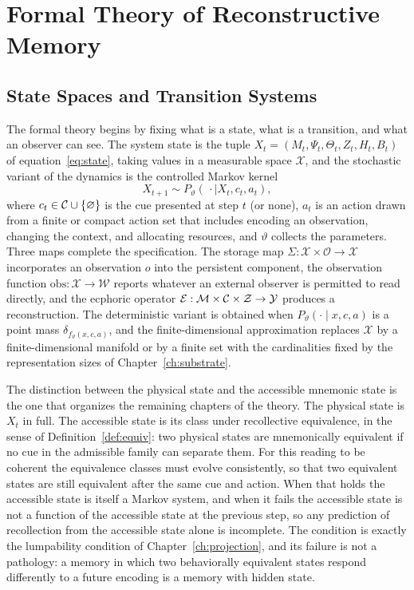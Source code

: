 \part{Formal Theory of Reconstructive Memory}

\chapter{State Spaces and Transition Systems}\label{ch:transition}

The formal theory begins by fixing what is a state, what is a transition, and what an observer can see. The system state is the tuple $X_t=(M_t,\Psi_t,\Theta_t,Z_t,H_t,B_t)$ of equation~\eqref{eq:state}, taking values in a measurable space $\mathcal X$, and the stochastic variant of the dynamics is the controlled Markov kernel
\begin{equation}\label{eq:kernel}
X_{t+1}\sim P_\vartheta(\,\cdot\mid X_t,c_t,a_t),
\end{equation}
where $c_t\in\mathcal{C}\cup\{\varnothing\}$ is the cue presented at step $t$ (or none), $a_t$ is an action drawn from a finite or compact action set that includes encoding an observation, changing the context, and allocating resources, and $\vartheta$ collects the parameters. Three maps complete the specification. The storage map $\Sigma:\mathcal X\times\mathcal O\to\mathcal X$ incorporates an observation $o$ into the persistent component, the observation function $\mathrm{obs}:\mathcal X\to\mathcal W$ reports whatever an external observer is permitted to read directly, and the ecphoric operator $\mathcal{E}:\mathcal{M}\times\mathcal{C}\times\mathcal Z\to\mathcal{Y}$ produces a reconstruction. The deterministic variant is obtained when $P_\vartheta(\cdot\mid x,c,a)$ is a point mass $\delta_{f_\vartheta(x,c,a)}$, and the finite-dimensional approximation replaces $\mathcal X$ by a finite-dimensional manifold or by a finite set with the cardinalities fixed by the representation sizes of Chapter~\ref{ch:substrate}.

The distinction between the physical state and the accessible mnemonic state is the one that organizes the remaining chapters of the theory. The physical state is $X_t$ in full. The accessible state is its class under recollective equivalence, in the sense of Definition~\ref{def:equiv}: two physical states are mnemonically equivalent if no cue in the admissible family can separate them. For this reading to be coherent the equivalence classes must evolve consistently, so that two equivalent states are still equivalent after the same cue and action. When that holds the accessible state is itself a Markov system, and when it fails the accessible state is not a function of the accessible state at the previous step, so any prediction of recollection from the accessible state alone is incomplete. The condition is exactly the lumpability condition of Chapter~\ref{ch:projection}, and its failure is not a pathology: a memory in which two behaviorally equivalent states respond differently to a future encoding is a memory with hidden state.

